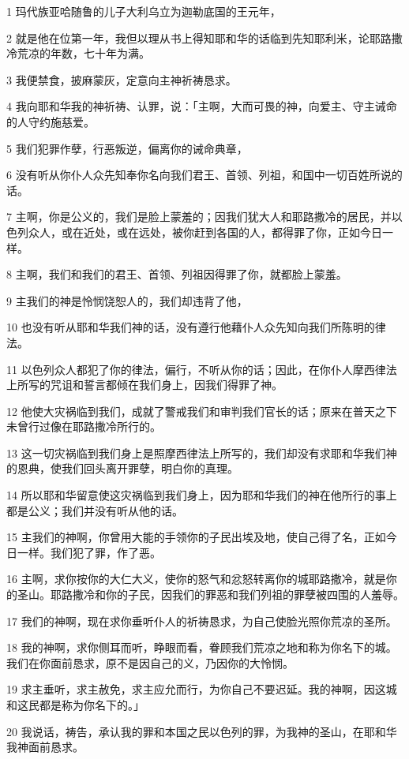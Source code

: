 \par 1 玛代族亚哈随鲁的儿子大利乌立为迦勒底国的王元年，
\par 2 就是他在位第一年，我但以理从书上得知耶和华的话临到先知耶利米，论耶路撒冷荒凉的年数，七十年为满。
\par 3 我便禁食，披麻蒙灰，定意向主神祈祷恳求。
\par 4 我向耶和华我的神祈祷、认罪，说：「主啊，大而可畏的神，向爱主、守主诫命的人守约施慈爱。
\par 5 我们犯罪作孽，行恶叛逆，偏离你的诫命典章，
\par 6 没有听从你仆人众先知奉你名向我们君王、首领、列祖，和国中一切百姓所说的话。
\par 7 主啊，你是公义的，我们是脸上蒙羞的；因我们犹大人和耶路撒冷的居民，并以色列众人，或在近处，或在远处，被你赶到各国的人，都得罪了你，正如今日一样。
\par 8 主啊，我们和我们的君王、首领、列祖因得罪了你，就都脸上蒙羞。
\par 9 主我们的神是怜悯饶恕人的，我们却违背了他，
\par 10 也没有听从耶和华我们神的话，没有遵行他藉仆人众先知向我们所陈明的律法。
\par 11 以色列众人都犯了你的律法，偏行，不听从你的话；因此，在你仆人摩西律法上所写的咒诅和誓言都倾在我们身上，因我们得罪了神。
\par 12 他使大灾祸临到我们，成就了警戒我们和审判我们官长的话；原来在普天之下未曾行过像在耶路撒冷所行的。
\par 13 这一切灾祸临到我们身上是照摩西律法上所写的，我们却没有求耶和华我们神的恩典，使我们回头离开罪孽，明白你的真理。
\par 14 所以耶和华留意使这灾祸临到我们身上，因为耶和华我们的神在他所行的事上都是公义；我们并没有听从他的话。
\par 15 主我们的神啊，你曾用大能的手领你的子民出埃及地，使自己得了名，正如今日一样。我们犯了罪，作了恶。
\par 16 主啊，求你按你的大仁大义，使你的怒气和忿怒转离你的城耶路撒冷，就是你的圣山。耶路撒冷和你的子民，因我们的罪恶和我们列祖的罪孽被四围的人羞辱。
\par 17 我们的神啊，现在求你垂听仆人的祈祷恳求，为自己使脸光照你荒凉的圣所。
\par 18 我的神啊，求你侧耳而听，睁眼而看，眷顾我们荒凉之地和称为你名下的城。我们在你面前恳求，原不是因自己的义，乃因你的大怜悯。
\par 19 求主垂听，求主赦免，求主应允而行，为你自己不要迟延。我的神啊，因这城和这民都是称为你名下的。」
\par 20 我说话，祷告，承认我的罪和本国之民以色列的罪，为我神的圣山，在耶和华我神面前恳求。
